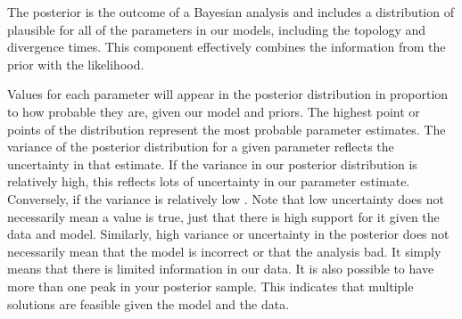 The posterior is the outcome of a Bayesian analysis and includes a distribution of plausible  for all of the  parameters  in our models, including the  topology and divergence times.
This component effectively combines the information from the prior with the likelihood. 

Values for each parameter will appear in the posterior distribution in proportion to how probable they are, given our model and priors.
The highest point or points of the distribution represent the most probable parameter estimates.
The variance of the posterior distribution for a given parameter reflects the uncertainty in that estimate.
If the variance in our posterior distribution is relatively high, this reflects lots of uncertainty in our parameter estimate.
Conversely, if the variance is relatively low .
Note that low uncertainty does not necessarily mean a value is true, just that there is high support for it given the data and model.
Similarly, high variance or uncertainty in the posterior does not necessarily mean that the model is incorrect or that the analysis  bad. It simply means that there is limited information in our data.
It is also possible to have more than one peak in your posterior sample.
This indicates that multiple solutions are feasible given the model and the data.

